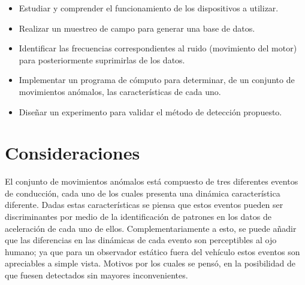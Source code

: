 \begin{itemize}
	\item {Estudiar y comprender el funcionamiento de los dispositivos a utilizar.}
\end{itemize}
\begin{itemize}
	\item {Realizar un muestreo de campo para generar una base de datos.}
\end{itemize}
\begin{itemize}
	\item {Identificar las frecuencias correspondientes al ruido (movimiento del motor) para posteriormente suprimirlas de los datos.}
\end{itemize}
\begin{itemize}
	\item {Implementar un programa de cómputo para determinar, de un conjunto de movimientos anómalos, las características de cada uno.}
\end{itemize}
\begin{itemize}
	\item {Diseñar un experimento para validar el método de detección propuesto.}
\end{itemize}


\section{Consideraciones}
El conjunto de movimientos anómalos está compuesto de tres diferentes eventos de conducción, cada uno de los cuales presenta una dinámica característica diferente. 
Dadas estas características se piensa que estos eventos pueden ser discriminantes por medio de la identificación de patrones en los datos de aceleración de cada uno de ellos. 
Complementariamente a esto, se puede añadir que las diferencias en las dinámicas de cada evento son perceptibles al ojo humano; ya que para un observador estático fuera del vehículo estos eventos son apreciables a simple vista. 
Motivos por los cuales se pensó, en la posibilidad de que fuesen detectados sin mayores inconvenientes.

